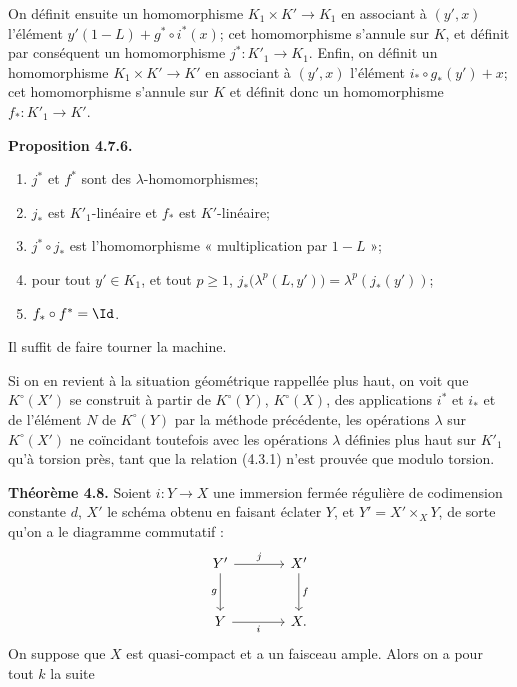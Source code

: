 On
définit ensuite un homomorphisme \(K_1\times K'\to K_1\) en associant à \((y',x)\) l'élément \(y'(1-L)+g^*\circ i^*(x)\); cet homomorphisme s'annule sur \(K\), et définit par conséquent un homomorphisme \(j^*:K'_1\longrightarrow K_1\). Enfin, on définit un homomorphisme \(K_1\times K'\to K'\) en associant à \((y',x)\) l'élément \(i_*\circ g_*(y')+x\); cet homomorphisme s'annule sur \(K\) et définit donc un homomorphisme \(f_*:K'_1\longrightarrow K'\).

\textbf{Proposition 4.7.6.}
\begin{enumerate}[label=\roman*)]
\item \(j^*\) et \(f^*\) sont des \(\lambda\)-homomorphismes;
\item \(j_*\) est \(K'_1\)-linéaire et \(f_*\) est \(K'\)-linéaire;
\item \(j^*\circ j_*\) est l'homomorphisme « multiplication par \(1-L\) »;
\item pour tout \(y'\in K_1\), et tout \(p\ge1\), \(j_*\bigl(\lambda^p(L,y')\bigr)=\lambda^p(j_*(y'))\);
\item \(f_*\circ f^*=\Id\).
\end{enumerate}
Il suffit de faire tourner la machine.

Si on en revient à la situation géométrique rappellée plus haut, on voit que \(K^\circ(X')\) se construit à partir de \(K^\circ(Y)\), \(K^\circ(X)\), des applications \(i^*\) et \(i_*\) et de l'élément \(N\) de \(K^\circ(Y)\) par la méthode précédente, les opérations \(\lambda\) sur \(K^\circ(X')\) ne coïncidant toutefois avec les opérations \(\lambda\) définies plus haut sur \(K'_1\) qu'à torsion près, tant que la relation (4.3.1) n'est prouvée que modulo torsion.

\textbf{Théorème 4.8.} Soient \(i:Y\to X\) une immersion fermée régulière de codimension constante \(d\), \(X'\) le schéma obtenu en faisant éclater \(Y\), et \(Y'=X'\times_XY\), de sorte qu'on a le diagramme commutatif :
\[
\begin{tikzcd}[column sep=large,row sep=large]
Y' \arrow[r,"j"] \arrow[d,"g"'] & X' \arrow[d,"f"]\\
Y \arrow[r,"i"'] & X.
\end{tikzcd}
\]
On suppose que \(X\) est quasi-compact et a un faisceau ample. Alors on a pour tout \(k\) la suite
